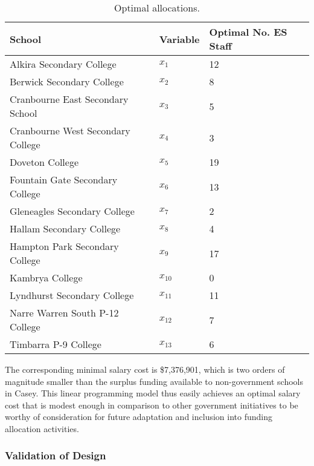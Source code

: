 \documentclass[11pt, a4paper]{article}
\begin{document}
    \begin{table}[!ht]
        \centering
        \caption{Optimal allocations.}
        \begin{tabular}{|l|l|l|}
            \hline
            School & Variable & Optimal No. ES Staff        \\ \hline
            Alkira Secondary College & $x_1$ & 12             \\ \hline
            Berwick Secondary College & $x_2$ & 8          \\ \hline
            Cranbourne East Secondary School & $x_3$ & 5            \\ \hline
            Cranbourne West Secondary College & $x_4$ & 3          \\ \hline
            Doveton College & $x_5$ & 19                        \\ \hline
            Fountain Gate Secondary College & $x_6$ & 13             \\ \hline
            Gleneagles Secondary College & $x_7$ & 2           \\ \hline
            Hallam Secondary College & $x_8$ & 4               \\ \hline
            Hampton Park Secondary College & $x_9$ & 17             \\ \hline
            Kambrya College & $x_{10}$ & 0                     \\ \hline
            Lyndhurst Secondary College & $x_{11}$ & 11                 \\ \hline
            Narre Warren South P-12 College & $x_{12}$ & 7                 \\ \hline
            Timbarra P-9 College & $x_{13}$ & 6                    \\ \hline
        \end{tabular}
        \label{results3}
    \end{table}

    The corresponding minimal salary cost is \$7,376,901, which is two orders of magnitude smaller than the surplus funding available to non-government schools in Casey. This linear programming model thus easily achieves an optimal salary cost that is modest enough in comparison to other government initiatives to be worthy of consideration for future adaptation and inclusion into funding allocation activities.

    \subsubsection{Validation of Design}
\end{document}
